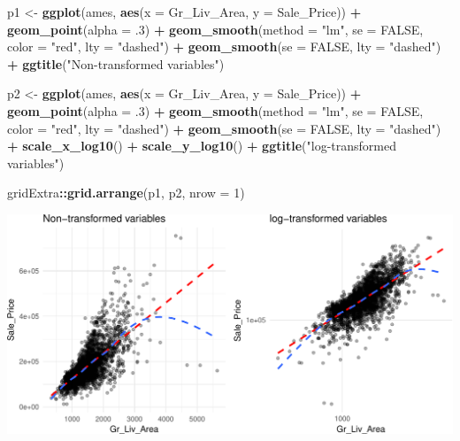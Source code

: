 \documentclass[]{article}
\newenvironment{Shaded}{\begin{snugshade}}{\end{snugshade}}
\newcommand{\KeywordTok}[1]{\textcolor[rgb]{0.13,0.29,0.53}{\textbf{#1}}}
\newcommand{\DataTypeTok}[1]{\textcolor[rgb]{0.13,0.29,0.53}{#1}}
\newcommand{\DecValTok}[1]{\textcolor[rgb]{0.00,0.00,0.81}{#1}}
\newcommand{\StringTok}[1]{\textcolor[rgb]{0.31,0.60,0.02}{#1}}
\newcommand{\OtherTok}[1]{\textcolor[rgb]{0.56,0.35,0.01}{#1}}
\newcommand{\OperatorTok}[1]{\textcolor[rgb]{0.81,0.36,0.00}{\textbf{#1}}}
\newcommand{\NormalTok}[1]{#1}
\begin{document}
\begin{Shaded}
\begin{Highlighting}[]
\NormalTok{p1 <-}\StringTok{ }\KeywordTok{ggplot}\NormalTok{(ames, }\KeywordTok{aes}\NormalTok{(}\DataTypeTok{x =}\NormalTok{ Gr_Liv_Area, }\DataTypeTok{y =}\NormalTok{ Sale_Price)) }\OperatorTok{+}
\StringTok{  }\KeywordTok{geom_point}\NormalTok{(}\DataTypeTok{alpha =}\NormalTok{ .}\DecValTok{3}\NormalTok{) }\OperatorTok{+}
\StringTok{  }\KeywordTok{geom_smooth}\NormalTok{(}\DataTypeTok{method =} \StringTok{"lm"}\NormalTok{, }\DataTypeTok{se =} \OtherTok{FALSE}\NormalTok{, }\DataTypeTok{color =} \StringTok{"red"}\NormalTok{, }\DataTypeTok{lty =} \StringTok{"dashed"}\NormalTok{) }\OperatorTok{+}
\StringTok{  }\KeywordTok{geom_smooth}\NormalTok{(}\DataTypeTok{se =} \OtherTok{FALSE}\NormalTok{, }\DataTypeTok{lty =} \StringTok{"dashed"}\NormalTok{) }\OperatorTok{+}
\StringTok{  }\KeywordTok{ggtitle}\NormalTok{(}\StringTok{"Non-transformed variables"}\NormalTok{)}

\NormalTok{p2 <-}\StringTok{ }\KeywordTok{ggplot}\NormalTok{(ames, }\KeywordTok{aes}\NormalTok{(}\DataTypeTok{x =}\NormalTok{ Gr_Liv_Area, }\DataTypeTok{y =}\NormalTok{ Sale_Price)) }\OperatorTok{+}
\StringTok{  }\KeywordTok{geom_point}\NormalTok{(}\DataTypeTok{alpha =}\NormalTok{ .}\DecValTok{3}\NormalTok{) }\OperatorTok{+}
\StringTok{  }\KeywordTok{geom_smooth}\NormalTok{(}\DataTypeTok{method =} \StringTok{"lm"}\NormalTok{, }\DataTypeTok{se =} \OtherTok{FALSE}\NormalTok{, }\DataTypeTok{color =} \StringTok{"red"}\NormalTok{, }\DataTypeTok{lty =} \StringTok{"dashed"}\NormalTok{) }\OperatorTok{+}
\StringTok{  }\KeywordTok{geom_smooth}\NormalTok{(}\DataTypeTok{se =} \OtherTok{FALSE}\NormalTok{, }\DataTypeTok{lty =} \StringTok{"dashed"}\NormalTok{) }\OperatorTok{+}
\StringTok{  }\KeywordTok{scale_x_log10}\NormalTok{() }\OperatorTok{+}
\StringTok{  }\KeywordTok{scale_y_log10}\NormalTok{() }\OperatorTok{+}
\StringTok{  }\KeywordTok{ggtitle}\NormalTok{(}\StringTok{"log-transformed variables"}\NormalTok{)}

\NormalTok{gridExtra}\OperatorTok{::}\KeywordTok{grid.arrange}\NormalTok{(p1, p2, }\DataTypeTok{nrow =} \DecValTok{1}\NormalTok{)}
\end{Highlighting}
\end{Shaded}

\begin{center}\includegraphics{Chapter_3_-_Visualization_files/figure-latex/dbl_scatter-1} \end{center}
\end{document}
